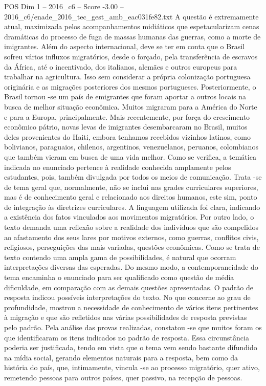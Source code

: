 \begin{textsample}{POS Dim 1 – 2016\_c6 – Score -3.00 – 2016\_c6/enade\_2016\_tec\_gest\_amb\_eac031fe82.txt}
A questão é extremamente atual, maximizada pelos acompanhamentos midiáticos que espetacularizam cenas dramáticas do processo de fuga de massas humanas das guerras, como a morte de imigrantes.
Além do aspecto internacional, deve se ter em conta que o Brasil sofreu vários influxos migratórios, desde o forçado, pela transferência de escravos da África, até o incentivado, dos italianos, alemães e outros europeus para trabalhar na agricultura.
Isso sem considerar a própria colonização portuguesa originária e as migrações posteriores dos mesmos portugueses.
Posteriormente, o Brasil tornou -se um país de emigrantes que foram aportar a outros locais na busca de melhor situação econômica.
Muitos migraram para a América do Norte e para a Europa, principalmente.
Mais recentemente, por força do crescimento econômico pátrio, novas levas de imigrantes desembarcaram no Brasil, muitos deles provenientes do Haiti, embora tenhamos recebidos vizinhos latinos, como bolivianos, paraguaios, chilenos, argentinos, venezuelanos, peruanos, colombianos que também vieram em busca de uma vida melhor.
Como se verifica, a temática indicada no enunciado pertence à realidade conhecida amplamente pelos estudantes, pois, também divulgada por todos os meios de comunicação.
Trata -se de tema geral que, normalmente, não se inclui nas grades curriculares superiores, mas é de conhecimento geral e relacionado aos direitos humanos, este sim, ponto de integração às diretrizes curriculares.
A linguagem utilizada foi clara, indicando a existência dos fatos vinculados aos movimentos migratórios.
Por outro lado, o texto demanda uma reflexão sobre a realidade dos indivíduos que são compelidos ao afastamento dos seus lares por motivos externos, como guerras, conflitos civis, religiosos, perseguições das mais variadas, questões econômicas.
Como se trata de texto contendo uma ampla gama de possibilidades, é natural que ocorram interpretações diversas das esperadas.
Do mesmo modo, a contemporaneidade do tema encaminha o enunciado para ser qualificado como questão de média dificuldade, em comparação com as demais questões apresentadas.
O padrão de resposta indicou possíveis interpretações do texto.
No que concerne ao grau de profundidade, mostrou a necessidade de conhecimento de vários itens pertinentes à migração e que são refletidos nas várias possibilidades de resposta previstas pelo padrão.
Pela análise das provas realizadas, constatou -se que muitos foram os que identificaram os itens indicados no padrão de resposta.
Essa circunstância poderia ser justificada, tendo em vista que o tema vem sendo bastante difundido na mídia social, gerando elementos naturais para a resposta, bem como da história do país, que, intimamente, vincula -se ao processo migratório, quer ativo, remetendo pessoas para outros países, quer passivo, na recepção de pessoas.

\end{textsample}
